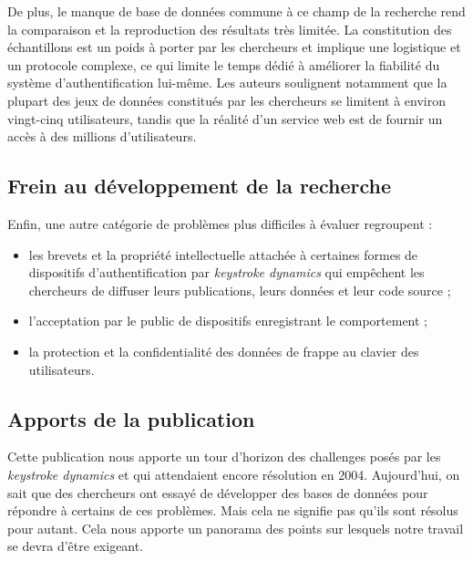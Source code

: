 De plus, le manque de base de données commune à ce champ de la recherche rend la comparaison et la reproduction des résultats très limitée. La constitution des échantillons est un poids à porter par les chercheurs et implique une logistique et un protocole complexe, ce qui limite le temps dédié à améliorer la fiabilité du système d'authentification lui-même. Les auteurs soulignent notamment que la plupart des jeux de données constitués par les chercheurs se limitent à environ vingt-cinq utilisateurs, tandis que la réalité d'un service web est de fournir un accès à des millions d'utilisateurs.

\subsection{Frein au développement de la recherche}
Enfin, une autre catégorie de problèmes plus difficiles à évaluer regroupent :

\begin{itemize}
	\item les brevets et la propriété intellectuelle attachée à certaines formes de dispositifs d'authentification par \textit{keystroke dynamics} qui empêchent les chercheurs de diffuser leurs publications, leurs données et leur code source ;
	\item l'acceptation par le public de dispositifs enregistrant le comportement ;
	\item la protection et la confidentialité des données de frappe au clavier des utilisateurs.
\end{itemize}

\subsection{Apports de la publication}
Cette publication nous apporte un tour d'horizon des challenges posés par les \textit {keystroke dynamics} et qui attendaient encore résolution en 2004. Aujourd'hui, on sait que des chercheurs ont essayé de développer des bases de données pour répondre à certains de ces problèmes. Mais cela ne signifie pas qu'ils sont résolus pour autant. Cela nous apporte un panorama des points sur lesquels notre travail se devra d'être exigeant.